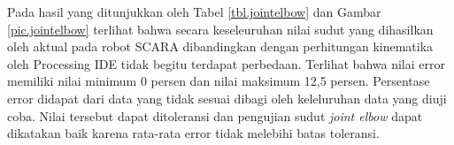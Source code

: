  Pada hasil yang ditunjukkan oleh Tabel \ref{tbl.jointelbow} dan Gambar \ref{pic.jointelbow} terlihat bahwa secara keseleuruhan nilai sudut yang dihasilkan oleh aktual pada robot SCARA dibandingkan dengan perhitungan kinematika oleh Processing IDE tidak begitu terdapat perbedaan. Terlihat bahwa nilai error
 memiliki nilai minimum 0 persen dan nilai maksimum 12,5 persen. Persentase error didapat dari data yang tidak sesuai dibagi oleh keleluruhan data yang diuji coba. Nilai tersebut dapat ditoleransi dan pengujian sudut \textit{joint elbow} dapat dikatakan baik karena rata-rata error tidak melebihi batas toleransi.


